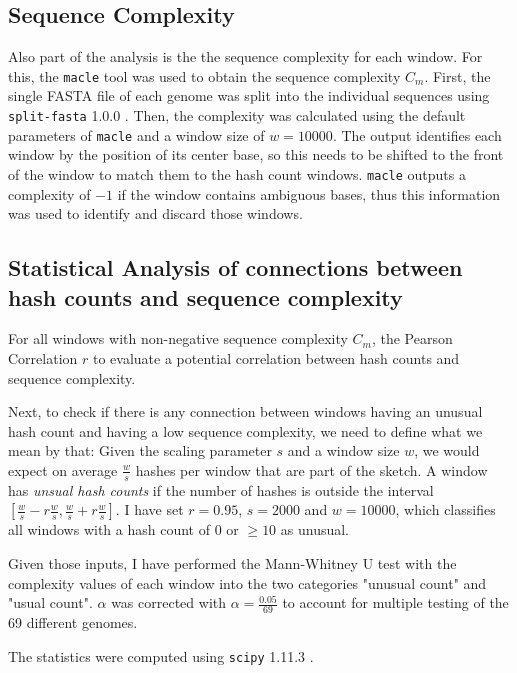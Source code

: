 \subsection*{Sequence Complexity}
Also part of the analysis is the the sequence complexity for each window. For
this, the \texttt{macle} tool \cite{pirogovHighcomplexityRegionsMammalian2019}
was used to obtain the sequence complexity $C_m$. First, the single FASTA file
of each genome was split into the individual sequences using
\texttt{split-fasta} 1.0.0 \cite{vashishtSplitfasta2020}. Then, the complexity
was calculated using the default parameters of \texttt{macle} and a window size
of $w=10000$. The output identifies each window by the position of its center
base, so this needs to be shifted to the front of the window to match them to
the hash count windows. \texttt{macle} outputs a complexity of $-1$ if the
window contains ambiguous bases, thus this information was used to identify and
discard those windows.

\subsection*{Statistical Analysis of connections between hash counts and sequence complexity}
For all windows with non-negative sequence complexity $C_m$, the Pearson
Correlation $r$ to evaluate a potential correlation between hash counts and
sequence complexity.

Next, to check if there is any connection between windows having an unusual hash
count and having a low sequence complexity, we need to define what we mean by
that: Given the scaling parameter $s$ and a window size $w$, we would expect on
average $\frac{w}{s}$ hashes per window that are part of the sketch. A window
has \textit{unsual hash counts} if the number of hashes is outside the interval
$[\frac{w}{s} - r \frac{w}{s}, \frac{w}{s} + r \frac{w}{s}]$. I have set
$r=0.95$, $s=2000$ and $w=10000$, which classifies all windows with a hash count
of $0$ or $\geq 10$ as unusual.

Given those inputs, I have performed the Mann-Whitney U test
\cite{mannTestWhetherOne1947,wilcoxonIndividualComparisonsRanking1945} with the
complexity values of each window into the two categories "unusual count" and
"usual count". $\alpha$ was corrected with $\alpha = \frac{0.05}{69}$ to account
for multiple testing of the 69 different genomes.

The statistics were computed using \texttt{scipy} 1.11.3
\cite{virtanenSciPyFundamentalAlgorithms2020}.


